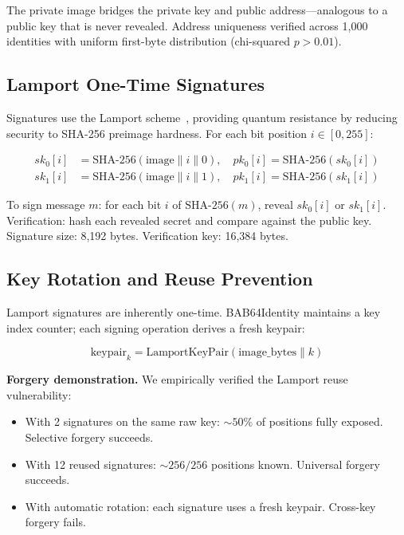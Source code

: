 \documentclass[preprint]{iacrtrans}
\begin{document}
The private image bridges the private key and public address---analogous to a public key that is never revealed. Address uniqueness verified across 1{,}000 identities with uniform first-byte distribution (chi-squared $p > 0.01$).

\subsection{Lamport One-Time Signatures}

Signatures use the Lamport scheme~\cite{lamport1979}, providing quantum resistance by reducing security to SHA-256 preimage hardness. For each bit position $i \in [0, 255]$:

\begin{align*}
sk_0[i] &= \text{SHA-256}(\text{image} \| i \| 0), \quad pk_0[i] = \text{SHA-256}(sk_0[i]) \\
sk_1[i] &= \text{SHA-256}(\text{image} \| i \| 1), \quad pk_1[i] = \text{SHA-256}(sk_1[i])
\end{align*}

To sign message $m$: for each bit $i$ of $\text{SHA-256}(m)$, reveal $sk_0[i]$ or $sk_1[i]$. Verification: hash each revealed secret and compare against the public key. Signature size: 8{,}192 bytes. Verification key: 16{,}384 bytes.

\subsection{Key Rotation and Reuse Prevention}

Lamport signatures are inherently one-time. BAB64Identity maintains a key index counter; each signing operation derives a fresh keypair:

$$\text{keypair}_k = \text{LamportKeyPair}(\text{image\_bytes} \| k)$$

\textbf{Forgery demonstration.} We empirically verified the Lamport reuse vulnerability:

\begin{itemize}
    \item With 2 signatures on the same raw key: ${\sim}50\%$ of positions fully exposed. Selective forgery succeeds.
    \item With 12 reused signatures: ${\sim}256/256$ positions known. Universal forgery succeeds.
    \item With automatic rotation: each signature uses a fresh keypair. Cross-key forgery fails.
\end{itemize}
\end{document}
